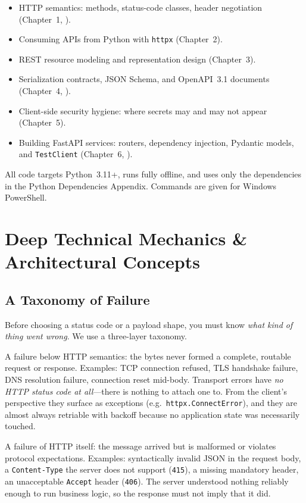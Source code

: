 \begin{itemize}
  \item HTTP semantics: methods, status-code classes, header negotiation
        (Chapter~1, \cite{rfc9110}).
  \item Consuming APIs from Python with \texttt{httpx} (Chapter~2).
  \item REST resource modeling and representation design (Chapter~3).
  \item Serialization contracts, JSON Schema, and OpenAPI~3.1 documents
        (Chapter~4, \cite{openapi31}).
  \item Client-side security hygiene: where secrets may and may not appear
        (Chapter~5).
  \item Building FastAPI services: routers, dependency injection, Pydantic
        models, and \texttt{TestClient} (Chapter~6, \cite{fastapidocs}).
\end{itemize}

All code targets Python~3.11+, runs fully offline, and uses only the
dependencies in the Python Dependencies Appendix. Commands are given for
Windows PowerShell.

\section{Deep Technical Mechanics \& Architectural Concepts}

\subsection{A Taxonomy of Failure}

Before choosing a status code or a payload shape, you must know
\emph{what kind of thing went wrong}. We use a three-layer taxonomy.

\begin{definition}
A failure below HTTP semantics: the bytes never formed a complete, routable
request or response. Examples: TCP connection refused, TLS handshake failure,
DNS resolution failure, connection reset mid-body. Transport errors have
\emph{no HTTP status code at all}---there is nothing to attach one to. From
the client's perspective they surface as exceptions (e.g.\
\texttt{httpx.ConnectError}), and they are almost always retriable with
backoff because no application state was necessarily touched.
\end{definition}

\begin{definition}
A failure of HTTP itself: the message arrived but is malformed or violates
protocol expectations. Examples: syntactically invalid JSON in the request
body, a \texttt{Content-Type} the server does not support (\texttt{415}),
a missing mandatory header, an unacceptable \texttt{Accept} header
(\texttt{406}). The server understood nothing reliably enough to run business
logic, so the response must not imply that it did.
\end{definition}

